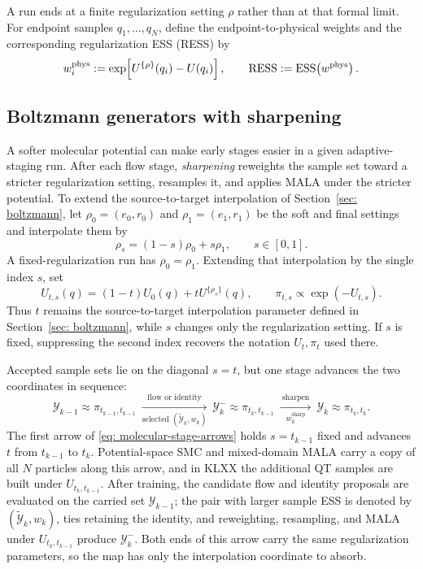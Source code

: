 \documentclass{article}
\begin{document}
A run ends at a finite regularization setting \(\rho\) rather than at that formal limit. For endpoint samples $q_1,\ldots,q_N$, define the endpoint-to-physical weights and the corresponding regularization ESS (RESS) by
\begin{equation}
w_i^{\mathrm{phys}}
:=\exp\!\left[U^{\{\rho\}}(q_i)-U(q_i)\right],
\qquad
\operatorname{RESS}:=\mathrm{ESS}\!\left(w^{\mathrm{phys}}\right).
\label{eq: molecular-ress}
\end{equation}

\subsection{Boltzmann generators with sharpening}
\label{sec: mol-sharpening}

A softer molecular potential can make early stages easier in a given adaptive-staging run. After each flow stage, \emph{sharpening} reweights the sample set toward a stricter regularization setting, resamples it, and applies MALA under the stricter potential. To extend the source-to-target interpolation of Section~\ref{sec: boltzmann}, let $\rho_0=(e_0,r_0)$ and $\rho_1=(e_1,r_1)$ be the soft and final settings and interpolate them by
\begin{equation*}
\rho_s=(1-s)\rho_0+s\rho_1,
\qquad s\in[0,1].
\end{equation*}
A fixed-regularization run has \(\rho_0=\rho_1\). Extending that interpolation by the single index \(s\), set
\begin{equation*}
U_{t,s}(q)=(1-t)U_0(q)+tU^{\{\rho_s\}}(q),
\qquad
\pi_{t,s}\propto\exp(-U_{t,s}).
\end{equation*}
Thus \(t\) remains the source-to-target interpolation parameter defined in Section~\ref{sec: boltzmann}, while \(s\) changes only the regularization setting. If \(s\) is fixed, suppressing the second index recovers the notation \(U_t,\pi_t\) used there.

Accepted sample sets lie on the diagonal $s=t$, but one stage advances the two coordinates in sequence:
\begin{equation}
\mathcal Y_{k-1}\approx\pi_{t_{k-1},t_{k-1}}
\ \xrightarrow[
    \text{selected }(\tilde{\mathcal Y}_k,w_k)
]{\ \text{flow or identity}\ }\
\mathcal Y_k^-\approx\pi_{t_k,t_{k-1}}
\ \xrightarrow[
    w_k^{\mathrm{sharp}}
]{\ \text{sharpen}\ }\
\mathcal Y_k\approx\pi_{t_k,t_k}.
\label{eq: molecular-stage-arrows}
\end{equation}
The first arrow of \eqref{eq: molecular-stage-arrows} holds $s=t_{k-1}$ fixed and advances $t$ from $t_{k-1}$ to $t_k$. Potential-space SMC and mixed-domain MALA carry a copy of all $N$ particles along this arrow, and in KLXX the additional QT samples are built under $U_{t_k,t_{k-1}}$. After training, the candidate flow and identity proposals are evaluated on the carried set $\mathcal Y_{k-1}$; the pair with larger sample ESS is denoted by $(\tilde{\mathcal Y}_k,w_k)$, ties retaining the identity, and reweighting, resampling, and MALA under $U_{t_k,t_{k-1}}$ produce $\mathcal Y_k^-$. Both ends of this arrow carry the same regularization parameters, so the map has only the interpolation coordinate to absorb.
\end{document}
